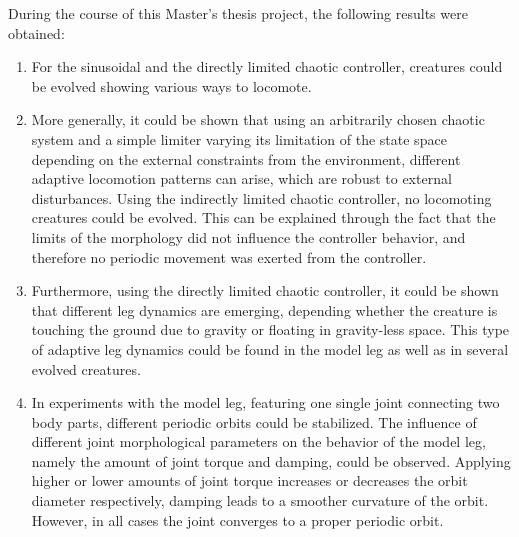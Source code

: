 \documentclass[main]{subfiles}
\begin{document}
%
During the course of this Master's thesis project, the following results were obtained:
%
\begin{enumerate}
\item For the sinusoidal and the directly limited chaotic controller, creatures could be evolved showing various ways to locomote. %
%
\item More generally, it could be shown that using an arbitrarily chosen chaotic system and a simple limiter varying its limitation of the state space depending on the external constraints from the environment, different adaptive locomotion patterns can arise, which are robust to external disturbances. %
%
Using the indirectly limited chaotic controller, no locomoting creatures could be evolved. %
%
This can be explained through the fact that the limits of the morphology did not influence the controller behavior, and therefore no periodic movement was exerted from the controller. %
%
\item Furthermore, using the directly limited chaotic controller, it could be shown that different leg dynamics are emerging, depending whether the creature is touching the ground due to gravity or floating in gravity-less space. %
%
This type of adaptive leg dynamics could be found in the model leg as well as in several evolved creatures. %
%
\item In experiments with the model leg, featuring one single joint connecting two body parts, different periodic orbits could be stabilized. %
%
The influence of different joint morphological parameters on the behavior of the model leg, namely the amount of joint torque and damping, could be observed. %
%
Applying higher or lower amounts of joint torque increases or decreases the orbit diameter respectively, damping leads to a smoother curvature of the orbit. %
%
However, in all cases the joint converges to a proper periodic orbit.
\end{enumerate}
\end{document}
